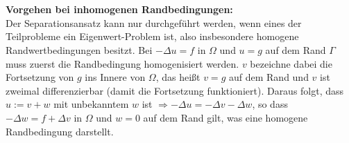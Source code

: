     	\\\\
    	\textbf{Vorgehen bei inhomogenen Randbedingungen:}\\
    	Der Separationsansatz kann nur durchgeführt werden, wenn eines der Teilprobleme ein Eigenwert-Problem ist, also insbesondere homogene Randwertbedingungen besitzt. Bei $-\Delta u =f$ in $\Omega$ und $u=g$ auf dem Rand $\Gamma$ muss zuerst die Randbedingung homogenisiert werden. $v$ bezeichne dabei die Fortsetzung von $g$ ins Innere von $\Omega$, das heißt $v=g$ auf dem Rand und $v$ ist zweimal differenzierbar (damit die Fortsetzung funktioniert). Daraus folgt, dass $u:=v+w$ mit unbekanntem $w$ ist $\Rightarrow -\Delta u =-\Delta v - \Delta w$, so dass $-\Delta w= f+ \Delta v$ in $\Omega$ und $w=0$ auf dem Rand gilt, was eine homogene Randbedingung darstellt.\\ 
